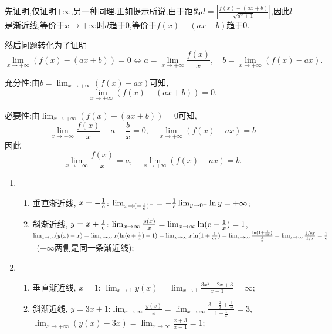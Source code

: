 \begin{solution}
    先证明,仅证明$+\infty$,另一种同理.正如提示所说,由于距离$d=\left| \frac{f(x)-(ax+b)}{\sqrt{a^2+1}} \right|$,因此$l$是渐近线,等价于$x\to+\infty$时$d$趋于$0$,等价于$f(x)-(ax+b)$趋于$0$.
    
    然后问题转化为了证明$$\lim_{x \to +\infty} (f(x) - (ax+b)) = 0 \Leftrightarrow a = \lim_{x \to +\infty} \frac{f(x)}{x}, \quad b = \lim_{x \to +\infty} (f(x)-ax).$$

    充分性:由$b = \lim_{x \to +\infty} (f(x)-ax)$可知, $$\lim_{x \to +\infty} (f(x) - (ax+b)) = 0.$$

    必要性:由$\lim_{x \to +\infty} (f(x) - (ax+b)) = 0$可知, $$\lim_{x \to +\infty} \frac{f(x)}{x} - a - \frac{b}{x} = 0, \quad \lim_{x \to +\infty} (f(x)-ax) = b$$因此$$\lim_{x \to +\infty} \frac{f(x)}{x} = a, \quad \lim_{x \to +\infty} (f(x)-ax) = b.$$



    \begin{enumerate}[(1)]
        \item
              \begin{enumerate}
                  \item 垂直渐近线, $x=- \frac{1}{\mathrm{e}}$: $\lim_{x \to (-\frac{1}{\mathrm{e}})^-} = -\frac{1}{\mathrm{e}} \lim_{y \to 0^+} \ln y = +\infty$;
                  \item 斜渐近线, $y=x + \frac{1}{\mathrm{e}}$: $\lim_{x \to \infty} \frac{y(x)}{x} = \lim_{x \to \infty} \ln(\mathrm{e} + \frac{1}{x}) = 1$, $\lim_{x \to  \infty} (y(x) - x) = \lim_{x \to \infty} x(\ln(\mathrm{e} + \frac{1}{x}) - 1) = \lim_{x \to \infty} x\ln(1 + \frac{1}{\mathrm{e} x}) = \lim_{x \to \infty} \frac{\ln(1 + \frac{1}{\mathrm{e} x})}{\frac{1}{x}} = \lim_{x \to  \infty} \frac{1 / \mathrm{e} x}{1 / x} = \frac{1}{\mathrm{e}}$ \ ($\pm\infty$两侧是同一条渐近线);
              \end{enumerate}
        \item
              \begin{enumerate}
                  \item 垂直渐近线, $x=1$: $\lim_{x \to 1} y(x) = \lim_{x \to 1} \frac{3x^2 - 2x + 3}{x-1} = \infty$;
                  \item 斜渐近线, $y=3x+1$:$\lim_{x \to \infty} \frac{y(x)}{x} = \lim_{x \to  \infty} \frac{3 - \frac{2}{x} + \frac{3}{x^2}}{1 - \frac{1}{x}} = 3$, $\lim_{x \to + \infty} (y(x) - 3x) = \lim_{x \to \infty} \frac{x+3}{x-1} = 1$;
              \end{enumerate}
    \end{enumerate}
\end{solution}

